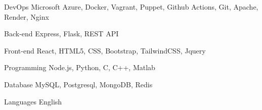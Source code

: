 

\begin{cvskills}

  \cvskill
    {DevOps} %
    {Microsoft Azure, Docker, Vagrant, Puppet, Github Actions, Git, Apache, Render, Nginx} %

  \cvskill
    {Back-end} %
    {Express, Flask, REST API} %

  \cvskill
    {Front-end} %
    {React, HTML5, CSS, Bootstrap, TailwindCSS, Jquery} %

  \cvskill
    {Programming} %
    {Node.js, Python, C, C++, Matlab} %

  \cvskill
    {Database} %
    {MySQL, Postgresql, MongoDB, Redis} %

  \cvskill
    {Languages} %
    {English} %

\end{cvskills}
